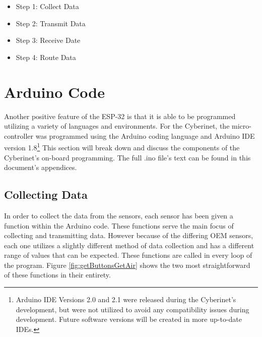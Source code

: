 \begin{itemize}
    \item Step 1: Collect Data
    \item Step 2: Transmit Data
    \item Step 3: Receive Date
    \item Step 4: Route Data
\end{itemize}

\section{Arduino Code}
Another positive feature of the ESP-32 is that it is able to be programmed utilizing a variety of languages and environments. For the Cyberinet, the micro-controller was programmed using the Arduino coding language and Arduino IDE version 1.8\footnote{Arduino IDE Versions 2.0 and 2.1 were released during the Cyberinet's development, but were not utilized to avoid any compatibility issues during development. Future software versions will be created in more up-to-date IDEs.} This section will break down and discuss the components of the Cyberinet's on-board programming. The full .ino file's text can be found in this document's appendices.

\subsection{Collecting Data}
In order to collect the data from the sensors, each sensor has been given a function within the Arduino code. These functions serve the main focus of collecting and transmitting data. However because of the differing OEM sensors, each one utilizes a slightly different method of data collection and has a different range of values that can be expected. These functions are called in every loop of the program. Figure \ref{fig:getButtonsGetAir} shows the two most straightforward of these functions in their entirety.

